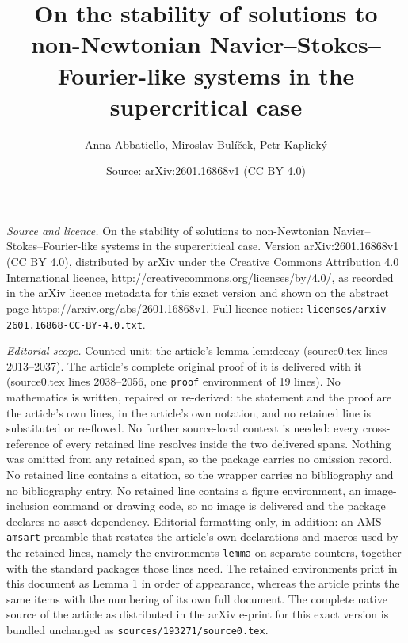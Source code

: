 \documentclass[10pt,a4paper]{amsart}
\title{On the stability of solutions to non-Newtonian Navier--Stokes--Fourier-like systems in the supercritical case}
\author{Anna Abbatiello, Miroslav Bul\'i\v{c}ek, Petr Kaplick\'y}
\date{Source: arXiv:2601.16868v1 (CC BY 4.0)}
\begin{document}
\maketitle

\noindent\emph{Source and licence.} On the stability of solutions to non-Newtonian Navier--Stokes--Fourier-like systems in the supercritical case. Version arXiv:2601.16868v1 (CC BY 4.0), distributed by arXiv under the Creative Commons Attribution 4.0 International licence, http://creativecommons.org/licenses/by/4.0/, as recorded in the arXiv licence metadata for this exact version and shown on the abstract page https://arxiv.org/abs/2601.16868v1. Full licence notice: \texttt{licenses/arxiv-2601.16868-CC-BY-4.0.txt}.\par\smallskip

\noindent\textit{Editorial scope.} Counted unit: the article's lemma lem:decay (source0.tex lines 2013--2037). The article's complete original proof of it is delivered with it (source0.tex lines 2038--2056, one \texttt{proof} environment of 19 lines). No mathematics is written, repaired or re-derived: the statement and the proof are the article's own lines, in the article's own notation, and no retained line is substituted or re-flowed.  No further source-local context is needed: every cross-reference of every retained line resolves inside the two delivered spans.  Nothing was omitted from any retained span, so the package carries no omission record.  No retained line contains a citation, so the wrapper carries no bibliography and no bibliography entry.  No retained line contains a figure environment, an image-inclusion command or drawing code, so no image is delivered and the package declares no asset dependency.  Editorial formatting only, in addition: an AMS \texttt{amsart} preamble that restates the article's own declarations and macros used by the retained lines, namely the environments \texttt{lemma} on separate counters, together with the standard packages those lines need.  The retained environments print in this document as Lemma 1 in order of appearance, whereas the article prints the same items with the numbering of its own full document.  The complete native source of the article as distributed in the arXiv e-print for this exact version is bundled unchanged as \texttt{sources/193271/source0.tex}.
\end{document}
